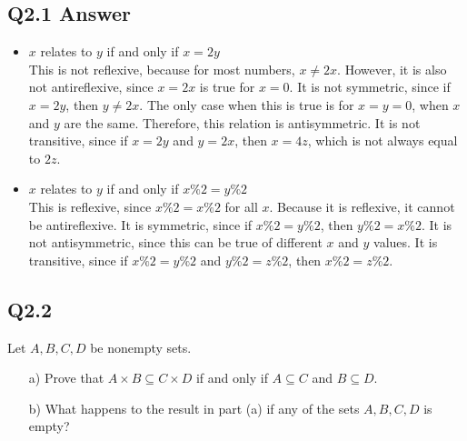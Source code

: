 \documentclass{article}
\begin{document}
\subsection*{Q2.1 Answer}
\begin{itemize}
    \item $x$ relates to $y$ if and only if $x=2y$
    \\ This is not reflexive, because for most numbers, $x\neq 2x$. However, it is also not antireflexive, since $x=2x$ is true for $x=0$. It is not symmetric, since if $x=2y$, then $y\neq2x$. The only case when this is true is for $x=y=0$, when $x$ and $y$ are the same. Therefore, this relation is antisymmetric. It is not transitive, since if $x=2y$ and $y=2x$, then $x=4z$, which is not always equal to $2z$.
    \item $x$ relates to $y$ if and only if $x\%2=y\%2$
    \\ This is reflexive, since $x\%2=x\%2$ for all $x$. Because it is reflexive, it cannot be antireflexive. It is symmetric, since if $x\%2=y\%2$, then   $y\%2=x\%2$. It is not antisymmetric, since this can be true of different $x$ and $y$ values. It is transitive, since if $x\%2=y\%2$ and $y\%2=z\%2$, then $x\%2=z\%2$.
\end{itemize}
\newpage
{}
\subsection*{Q2.2}
Let \( A, B, C, D \) be nonempty sets.
\begin{enumerate}
    \item[a)] Prove that \( A \times B \subseteq C \times D \) if and only if \( A \subseteq C \) and \( B \subseteq D \).
    \item[b)] What happens to the result in part (a) if any of the sets \( A, B, C, D \) is empty?
\end{enumerate}
\newpage
{}
\end{document}
